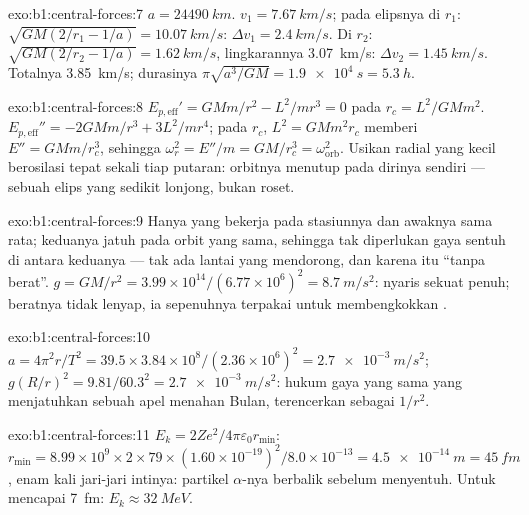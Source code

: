 \begin{solution}{exo:b1:central-forces:7}
$a = \qty{24490}{km}$. $v_1 = \qty{7.67}{km/s}$; pada elipsnya di $r_1$:
$\sqrt{GM(2/r_1 - 1/a)} = \qty{10.07}{km/s}$: $\Delta v_1 = \qty{2.4}{km/s}$.
Di $r_2$: $\sqrt{GM(2/r_2 - 1/a)} = \qty{1.62}{km/s}$, lingkarannya
\qty{3.07}{km/s}: $\Delta v_2 = \qty{1.45}{km/s}$. Totalnya \qty{3.85}{km/s};
durasinya $\pi\sqrt{a^3/GM} = \qty{1.9e4}{s} = \qty{5.3}{h}$.
\end{solution}

\begin{solution}{exo:b1:central-forces:8}
$E_{p,\mathrm{eff}}' = GMm/r^2 - L^2/mr^3 = 0$ pada $r_c = L^2/GMm^2$.
$E_{p,\mathrm{eff}}'' = -2GMm/r^3 + 3L^2/mr^4$; pada $r_c$, $L^2 = GMm^2r_c$
memberi $E'' = GMm/r_c^3$, sehingga $\omega_r^2 = E''/m = GM/r_c^3 = \omega_{\text{orb}}^2$.
Usikan radial yang kecil berosilasi tepat sekali tiap putaran: orbitnya
menutup pada dirinya sendiri --- sebuah elips yang sedikit lonjong, bukan roset.
\end{solution}

\begin{solution}{exo:b1:central-forces:9}
Hanya  yang bekerja pada stasiunnya dan awaknya sama rata;
keduanya jatuh pada orbit yang sama, sehingga tak diperlukan gaya sentuh
di antara keduanya --- tak ada lantai yang mendorong, dan karena itu
``tanpa berat''. $g = GM/r^2 = 3.99\times10^{14}/(6.77\times10^6)^2
= \qty{8.7}{m/s^2}$:  nyaris sekuat penuh; beratnya tidak
lenyap, ia sepenuhnya terpakai untuk membengkokkan .
\end{solution}

\begin{solution}{exo:b1:central-forces:10}
$a = 4\pi^2r/T^2 = 39.5 \times 3.84\times10^8/(2.36\times10^6)^2 =
\qty{2.7e-3}{m/s^2}$; $g(R/r)^2 = 9.81/60.3^2 = \qty{2.7e-3}{m/s^2}$: hukum
gaya yang sama yang menjatuhkan sebuah apel menahan Bulan, terencerkan sebagai $1/r^2$.
\end{solution}

\begin{solution}{exo:b1:central-forces:11}
$E_k = 2Ze^2/4\pi\varepsilon_0r_{\min}$: $r_{\min} = 8.99\times10^9 \times 2 \times 79
\times (1.60\times10^{-19})^2/8.0\times10^{-13} = \qty{4.5e-14}{m} = \qty{45}{fm}$,
enam kali jari-jari intinya: partikel $\alpha$-nya berbalik sebelum
menyentuh. Untuk mencapai \qty{7}{fm}: $E_k \approx \qty{32}{MeV}$.
\end{solution}

